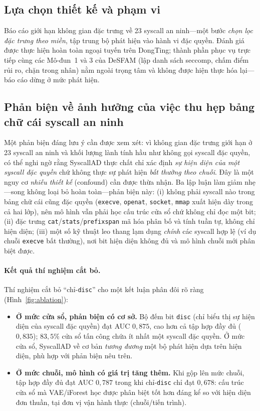 \subsection{Lựa chọn thiết kế và phạm vi}
Báo cáo giới hạn không gian đặc trưng về 23 syscall an ninh---một bước \emph{chọn lọc
đặc trưng theo miền}, tập trung bộ phát hiện vào hành vi đặc quyền. Đánh giá được
thực hiện hoàn toàn ngoại tuyến trên DongTing; thành phần phục vụ trực tiếp cùng các
Mô-đun~1 và 3 của DeSFAM (lập danh sách seccomp, chấm điểm rủi ro, chặn trong nhân)
nằm ngoài trọng tâm và không được hiện thực hóa lại---báo cáo dừng ở mức phát hiện.

\subsection{Phản biện về ảnh hưởng của việc thu hẹp bảng chữ cái syscall an ninh}
\label{subsec:confound}
Một phản biện đáng lưu ý cần được xem xét: vì không gian đặc trưng giới hạn ở 23
syscall an ninh và khối lượng lành tính hầu như không gọi syscall đặc quyền, có thể nghi ngờ rằng
SyscallAD thực chất chỉ xác định \emph{sự hiện diện của một syscall đặc quyền} chứ
không thực sự phát hiện \emph{bất thường theo chuỗi}. Đây là một nguy cơ
\emph{nhiễu thiết kế} (confound) cần được thừa nhận. Ba lập luận làm giảm nhẹ---song
không loại bỏ hoàn toàn---phản biện này: (i) không phải syscall nào trong bảng chữ
cái cũng đặc quyền (\texttt{execve}, \texttt{openat}, \texttt{socket}, \texttt{mmap}
xuất hiện dày trong cả hai lớp), nên mô hình vẫn phải học cấu trúc cửa sổ chứ không
chỉ đọc một bit; (ii) đặc trưng \texttt{cat}/\texttt{stats}/\texttt{prefixspan} mã
hóa phân bố và tính tuần tự, không chỉ hiện diện; (iii) một số kỹ thuật leo thang
lạm dụng \emph{chính} các syscall hợp lệ (ví dụ chuỗi \texttt{execve} bất thường),
nơi bit hiện diện không đủ và mô hình chuỗi mới phân biệt được.

\paragraph{Kết quả thí nghiệm cắt bỏ.} Thí nghiệm cắt bỏ ``chỉ-\texttt{disc}'' cho
một kết luận phân đôi rõ ràng (Hình~\ref{fig:ablation}):
\begin{itemize}[leftmargin=1.6em]
  \item \textbf{Ở mức cửa sổ, phản biện có cơ sở.} Bộ đếm bit \texttt{disc} (chỉ
        biểu thị sự hiện diện của syscall đặc quyền) đạt AUC $0{,}875$, cao hơn cả
        tập hợp đầy đủ ($0{,}835$); $83{,}5\%$ cửa sổ tấn công chứa ít nhất một
        syscall đặc quyền. Ở mức cửa sổ, SyscallAD về cơ bản \emph{tương đương} một
        bộ phát hiện dựa trên hiện diện, phù hợp với phản biện nêu trên.
  \item \textbf{Ở mức chuỗi, mô hình có giá trị tăng thêm.} Khi gộp lên mức chuỗi,
        tập hợp đầy đủ đạt AUC $0{,}787$ trong khi chỉ-\texttt{disc} chỉ đạt
        $0{,}678$: cấu trúc cửa sổ mà VAE/iForest học được phân biệt tốt hơn đáng kể
        so với hiện diện đơn thuần, tại đơn vị vận hành thực (chuỗi/tiến trình).
\end{itemize}

